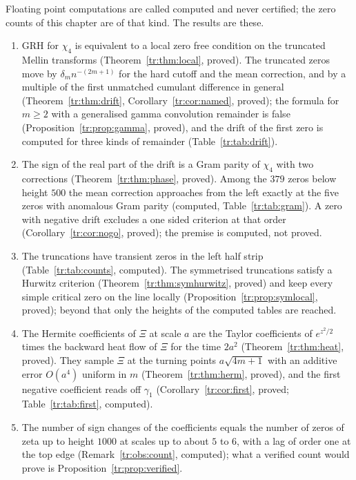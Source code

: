 Floating point computations are called computed and never certified; the zero counts of this chapter are of that kind. The results are these.
\begin{enumerate}
\item GRH for $\chi_4$ is equivalent to a local zero free condition on the truncated Mellin transforms (Theorem~\ref{tr:thm:local}, proved). The truncated zeros move by $\delta_mn^{-(2m+1)}$ for the hard cutoff and the mean correction, and by a multiple of the first unmatched cumulant difference in general (Theorem~\ref{tr:thm:drift}, Corollary~\ref{tr:cor:named}, proved); the formula for $m\ge2$ with a generalised gamma convolution remainder is false (Proposition~\ref{tr:prop:gamma}, proved), and the drift of the first zero is computed for three kinds of remainder (Table~\ref{tr:tab:drift}).
\item The sign of the real part of the drift is a Gram parity of $\chi_4$ with two corrections (Theorem~\ref{tr:thm:phase}, proved). Among the $379$ zeros below height $500$ the mean correction approaches from the left exactly at the five zeros with anomalous Gram parity (computed, Table~\ref{tr:tab:gram}). A zero with negative drift excludes a one sided criterion at that order (Corollary~\ref{tr:cor:nogo}, proved); the premise is computed, not proved.
\item The truncations have transient zeros in the left half strip (Table~\ref{tr:tab:counts}, computed). The symmetrised truncations satisfy a Hurwitz criterion (Theorem~\ref{tr:thm:symhurwitz}, proved) and keep every simple critical zero on the line locally (Proposition~\ref{tr:prop:symlocal}, proved); beyond that only the heights of the computed tables are reached.
\item The Hermite coefficients of $\Xi$ at scale $a$ are the Taylor coefficients of $e^{z^2/2}$ times the backward heat flow of $\Xi$ for the time $2a^2$ (Theorem~\ref{tr:thm:heat}, proved). They sample $\Xi$ at the turning points $a\sqrt{4m+1}$ with an additive error $O(a^4)$ uniform in $m$ (Theorem~\ref{tr:thm:herm}, proved), and the first negative coefficient reads off $\gamma_1$ (Corollary~\ref{tr:cor:first}, proved; Table~\ref{tr:tab:first}, computed).
\item The number of sign changes of the coefficients equals the number of zeros of zeta up to height $1000$ at scales up to about $5$ to $6$, with a lag of order one at the top edge (Remark~\ref{tr:obs:count}, computed); what a verified count would prove is Proposition~\ref{tr:prop:verified}.
\end{enumerate}

